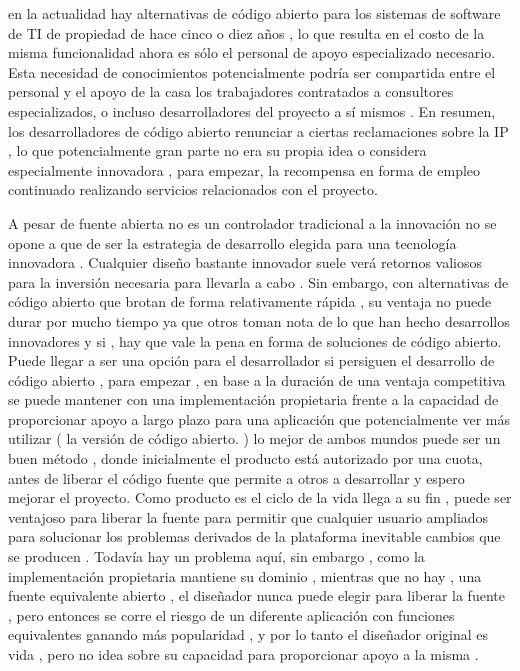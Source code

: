 \documentclass[a4paper,11pt]{article}
\begin{document}
en la actualidad hay alternativas de código abierto para los sistemas de software de TI de propiedad de hace cinco o diez años , lo que resulta en el costo de la misma funcionalidad ahora es sólo el personal de apoyo especializado necesario.
Esta necesidad de conocimientos potencialmente podría ser compartida entre el personal y el apoyo de la casa
los trabajadores contratados a consultores especializados, o incluso desarrolladores del proyecto
a sí mismos . En resumen, los desarrolladores de código abierto renunciar a ciertas reclamaciones sobre
la IP , lo que potencialmente gran parte no era su propia idea o considera especialmente
innovadora , para empezar, la recompensa en forma de empleo continuado realizando
servicios relacionados con el proyecto.

A pesar de fuente abierta no es un controlador tradicional a la innovación no se opone a
que de ser la estrategia de desarrollo elegida para una tecnología innovadora .
Cualquier diseño bastante innovador suele verá retornos valiosos para la inversión necesaria para llevarla a cabo . Sin embargo, con alternativas de código abierto que brotan de forma relativamente rápida , su ventaja no puede durar por mucho tiempo ya que otros toman nota de lo que han hecho desarrollos innovadores y si , hay que vale la pena en forma de soluciones de código abierto. Puede llegar a ser una opción para el desarrollador si persiguen el desarrollo de código abierto , para empezar , en base a la duración de una ventaja competitiva se puede mantener con una implementación propietaria frente a la capacidad de proporcionar apoyo a largo plazo para una aplicación que potencialmente ver más utilizar ( la versión de código abierto. ) lo mejor de ambos mundos puede ser un buen método , donde inicialmente el producto está autorizado por una cuota, antes de liberar el código fuente que permite a otros a desarrollar y espero mejorar el proyecto. Como producto es el ciclo de la vida llega a su fin , puede ser ventajoso para liberar la fuente
para permitir que cualquier usuario ampliados para solucionar los problemas derivados de la plataforma inevitable
cambios que se producen . Todavía hay un problema aquí, sin embargo , como la implementación propietaria mantiene su dominio , mientras que no hay , una fuente equivalente abierto ,
el diseñador nunca puede elegir para liberar la fuente , pero entonces se corre el riesgo de un diferente
aplicación con funciones equivalentes ganando más popularidad , y por lo tanto
el diseñador original es vida , pero no idea sobre su capacidad para proporcionar apoyo a la misma .
\end{document}
